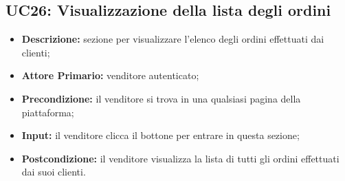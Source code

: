 \subsection{UC26: Visualizzazione della lista degli ordini}
\label{sec:UC26}
\begin{itemize}
    \item \textbf{Descrizione:} sezione per visualizzare l'elenco degli ordini effettuati dai clienti;
    \item \textbf{Attore Primario:} venditore autenticato;
    \item \textbf{Precondizione:} il venditore si trova in una qualsiasi pagina della piattaforma;
    \item \textbf{Input:} il venditore clicca il bottone per entrare in questa sezione;
    \item \textbf{Postcondizione:} il venditore visualizza la lista di tutti gli ordini effettuati dai suoi clienti.
\end{itemize}
